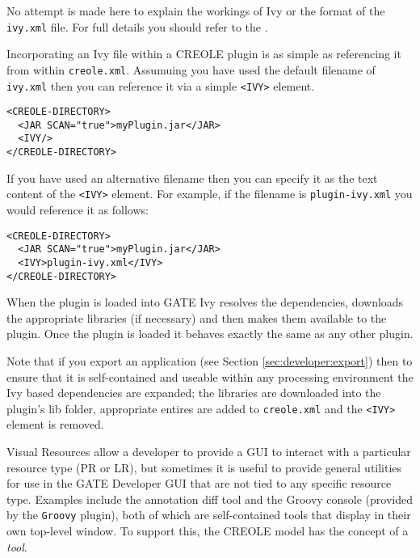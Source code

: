 No attempt is made here to explain the workings of Ivy or the format of
the {\tt ivy.xml} file. For full details you should refer to the
.

Incorporating an Ivy file within a CREOLE plugin is as simple as referencing
it from within {\tt creole.xml}. Assumuing you have used the default filename
of {\tt ivy.xml} then you can reference it via a simple \verb|<IVY>| element.

\begin{small}\begin{verbatim}
<CREOLE-DIRECTORY>
  <JAR SCAN="true">myPlugin.jar</JAR>
  <IVY/>
</CREOLE-DIRECTORY>
\end{verbatim}\end{small}

If you have used an alternative filename then you can specify it as the text
content of the \verb|<IVY>| element. For example, if the filename is {\tt plugin-ivy.xml}
you would reference it as follows:

\begin{small}\begin{verbatim}
<CREOLE-DIRECTORY>
  <JAR SCAN="true">myPlugin.jar</JAR>
  <IVY>plugin-ivy.xml</IVY>
</CREOLE-DIRECTORY>
\end{verbatim}\end{small}

When the plugin is loaded into GATE Ivy resolves the dependencies, downloads the
appropriate libraries (if necessary) and then makes them available to the plugin.
Once the plugin is loaded it behaves exactly the same as any other plugin.

Note that if you export an application (see Section \ref{sec:developer:export})
then to ensure that it is self-contained and useable within any processing
environment the Ivy based dependencies are expanded; the libraries are
downloaded into the plugin's lib folder, appropriate entires are added to
{\tt creole.xml} and the \verb|<IVY>| element is removed.


Visual Resources allow a developer to provide a GUI to interact with a
particular resource type (PR or LR), but sometimes it is useful to provide
general utilities for use in the GATE Developer GUI that are not tied to any
specific resource type.  Examples include the annotation diff tool and the
Groovy console (provided by the \verb|Groovy| plugin), both of which are
self-contained tools that display in their own top-level window.  To support
this, the CREOLE model has the concept of a {\em tool}.

